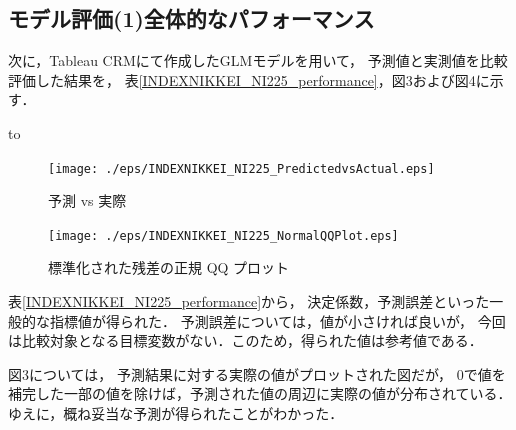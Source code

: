 \documentclass[submit,techrep,noauthor]{ipsj}
\begin{document}
\subsection{モデル評価(1)全体的なパフォーマンス}\label{evaluation2}
次に，Tableau CRMにて作成したGLMモデルを用いて，
予測値と実測値を比較評価した結果を，
表\ref{INDEXNIKKEI_NI225_performance}，図3および図4に示す．

\vspace{-2mm}
\begin{table}[h] 
\caption{全体的なパフォーマンス} 
\label{INDEXNIKKEI_NI225_performance}
\hbox to
\end{table}

\begin{figure}[h]
\begin{center}
\label{PredictedvsActual}
\texttt{[image: ./eps/INDEXNIKKEI\_NI225\_PredictedvsActual.eps]}
\caption{予測 vs 実際}
\end{center}
\end{figure}

\begin{figure}[h]
\begin{center}
\label{INDEXNIKKEI_NI225_NormalQQPlot}
\texttt{[image: ./eps/INDEXNIKKEI\_NI225\_NormalQQPlot.eps]}
\caption{標準化された残差の正規 QQ プロット}
\end{center}
\end{figure}

表\ref{INDEXNIKKEI_NI225_performance}から，
決定係数，予測誤差といった一般的な指標値が得られた．
予測誤差については，値が小さければ良いが，
今回は比較対象となる目標変数がない．このため，得られた値は参考値である．

図3については，
予測結果に対する実際の値がプロットされた図だが，
0で値を補完した一部の値を除けば，予測された値の周辺に実際の値が分布されている．
ゆえに，概ね妥当な予測が得られたことがわかった．
\end{document}
